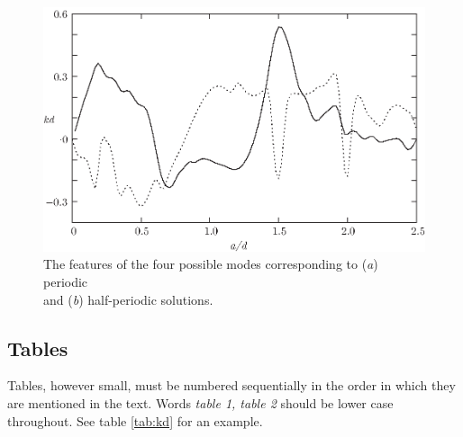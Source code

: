 \documentclass[lineno]{jfm}
\begin{document}
\begin{figure}
  \centerline{\includegraphics{Fig2}}
  \caption{The features of the four possible modes corresponding to
  (\textit{a}) periodic\protect\\ and (\textit{b}) half-periodic solutions.}
\label{fig:kd}
\end{figure}

\subsection{Tables}
 Tables, however small, must be numbered sequentially in the order in which they are mentioned in the text. Words \textit {table 1, table 2} should be lower case throughout.
 See table \ref{tab:kd} for an example.
\end{document}
